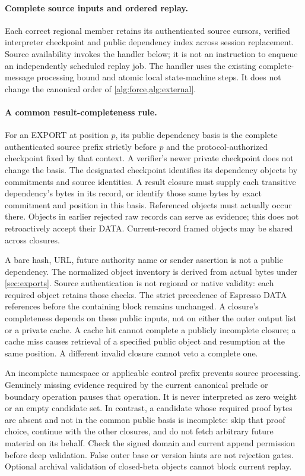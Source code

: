 \paragraph{Complete source inputs and ordered replay.}
\label{sec:source-step}
Each correct regional member retains its authenticated source cursors,
verified interpreter checkpoint and public dependency index across
session replacement. Source availability invokes the handler below;
it is not an instruction to enqueue an independently scheduled replay
job. The handler uses the existing complete-message processing bound
and atomic local state-machine steps. It does not change the canonical
order of \cref{alg:force,alg:external}.

\paragraph{A common result-completeness rule.}
\label{sec:record-completeness}
For an EXPORT at position $p$, its public dependency basis is the
complete authenticated source prefix strictly before $p$ and the
protocol-authorized checkpoint fixed by that context. A verifier's
newer private checkpoint does not change the basis. The designated
checkpoint identifies its dependency objects by commitments and source
identities. A result closure must supply each transitive dependency's
bytes in its record, or identify those same bytes by exact commitment
and position in this basis. Referenced objects must actually occur
there. Objects in earlier rejected raw records can serve as evidence;
this does not retroactively accept their DATA. Current-record framed
objects may be shared across closures.

A bare hash, URL, future authority name or sender assertion is not a
public dependency. The normalized object inventory is derived from
actual bytes under \cref{sec:exports}. Source authentication is not
regional or native validity: each required object retains those checks.
The strict precedence of Espresso DATA references before the containing
block remains unchanged. A closure's completeness depends on these
public inputs, not on either the outer output list or a private cache.
A cache hit cannot complete a publicly incomplete closure; a cache miss
causes retrieval of a specified public object and resumption at the same
position. A different invalid closure cannot veto a complete one.

An incomplete namespace or applicable control prefix prevents source
processing. Genuinely missing evidence required by the current
canonical prelude or boundary operation pauses that operation. It is
never interpreted as zero weight or an empty candidate set. In contrast,
a candidate whose required proof bytes are absent and not in the common
public basis is incomplete: skip that proof choice, continue with the
other closures, and do not fetch arbitrary future material on its
behalf. Check the signed domain and current append permission before
deep validation. False outer base or version hints are not rejection
gates. Optional archival validation of closed-beta objects cannot block
current replay.

